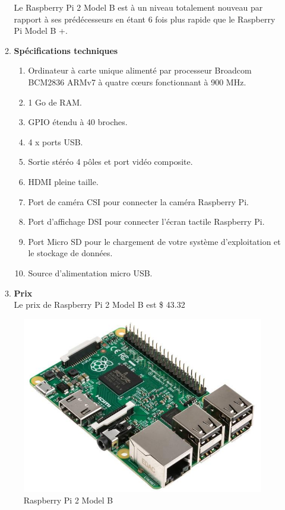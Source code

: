 \documentclass[12pt]{article}
\begin{document}
\begin{itemize}
\begin{enumerate}
		Le Raspberry Pi 2 Model B est à un niveau totalement nouveau par rapport à ses prédécesseurs en étant 6 fois plus rapide que le Raspberry Pi Model B +.
	\item \textbf{Spécifications techniques}\\
		\begin{enumerate}
			\item Ordinateur à carte unique alimenté par processeur Broadcom BCM2836 ARMv7 à quatre cœurs fonctionnant à 900 MHz.
			\item 1 Go de RAM.
			\item GPIO étendu à 40 broches.
			\item 4 x ports USB.
			\item Sortie stéréo 4 pôles et port vidéo composite.
			\item HDMI pleine taille.
			\item Port de caméra CSI pour connecter la caméra Raspberry Pi.
			\item Port d’affichage DSI pour connecter l’écran tactile Raspberry Pi.
			\item Port Micro SD pour le chargement de votre système d'exploitation et le stockage de données.
			\item Source d'alimentation micro USB.
\end{enumerate}
	\item \textbf{Prix}\\
	Le prix de Raspberry Pi 2 Model B est \$ 43.32
	\newpage
	\end{enumerate}
	\begin{figure}[h]
		\centernig
		\includegraphics[width=12cm]{img-Chapiter-3/raspbPi.jpg}
		\caption{Raspberry Pi 2 Model B}
	\end{figure}\\
	

\end{itemize}
\end{document}
